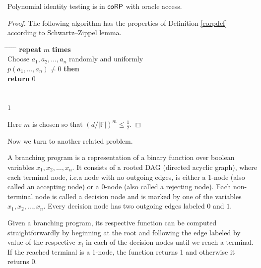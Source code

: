\begin{proposition}
Polynomial identity testing is in $\mathsf{coRP}$ with oracle access.
\end{proposition}
\begin{proof}
The following algorithm has the properties of Definition \ref{corpdef} according to Schwartz--Zippel lemma.

\begin{tabbing}
\hspace*{.25in} \= \hspace*{.25in} \= \hspace*{.25in} \= \hspace*{.25in} \= \hspace*{.25in} \=\kill
\> {\bf repeat} $m$ {\bf times}\\
\>\> Choose $a_1, a_2, \ldots, a_n$ randomly and uniformly\\
\> $p(a_1, \ldots, a_n) \not = 0$ {\bf then } \\
\>\>\> {\bf return} $0$ \\
\>\\
 \\
 $1$
\end{tabbing}

Here $m$ is chosen so that $ \left( d / \vert \mathbb{F} \vert \right) ^ m \leq \frac{1}{2} $.

\end{proof}

Now we turn to another related problem.

\begin{definition}
A branching program is a representation of a binary function over boolean variables $x_1, x_2, \ldots, x_n$. It consists of a rooted DAG (directed acyclic graph), where each terminal node, i.e.\@ a node with no outgoing edges, is either a 1-node (also called an accepting node) or a 0-node (also called a rejecting node). Each non-terminal node is called a decision node and is marked by one of the variables $x_1, x_2, \ldots, x_n$. Every decision node has two outgoing edges labeled $0$ and $1$. 

Given a branching program, its respective function can be computed straightforwardly by beginning at the root and following the edge labeled by value of the respective $x_i$ in each of the decision nodes until we reach a terminal. If the reached terminal is a 1-node, the function returns 1 and otherwise it returns 0.
\end{definition}

